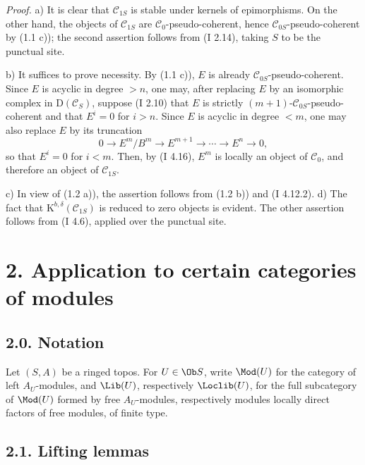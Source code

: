 \emph{Proof.} a) It is clear that $\mathcal C_{1S}$ is stable under kernels of epimorphisms. On the other hand, the objects of $\mathcal C_{1S}$ are $\mathcal C_0$-pseudo-coherent, hence $\mathcal C_{0S}$-pseudo-coherent by (1.1 c)); the second assertion follows from (I 2.14), taking $S$ to be the punctual site.

b) It suffices to prove necessity. By (1.1 c)), $E$ is already $\mathcal C_{0S}$-pseudo-coherent. Since $E$ is acyclic in degree $>n$, one may, after replacing $E$ by an isomorphic complex in $\mathrm D(\mathcal C_S)$, suppose (I 2.10) that $E$ is strictly $(m+1)$-$\mathcal C_{0S}$-pseudo-coherent and that $E^i=0$ for $i>n$. Since $E$ is acyclic in degree $<m$, one may also replace $E$ by its truncation
\[
0\longrightarrow E^m/B^m\longrightarrow E^{m+1}\longrightarrow\cdots\longrightarrow E^n\longrightarrow0,
\]
so that $E^i=0$ for $i<m$. Then, by (I 4.16), $E^m$ is locally an object of $\mathcal C_0$, and therefore an object of $\mathcal C_{1S}$.

c) In view of (1.2 a)), the assertion follows from (1.2 b)) and (I 4.12.2). d) The fact that $\mathrm K^{b,\delta}(\mathcal C_{1S})$ is reduced to zero objects is evident. The other assertion follows from (I 4.6), applied over the punctual site.

\section*{2. Application to certain categories of modules}

\subsection*{2.0. Notation}
Let $(S,A)$ be a ringed topos. For $U\in\Ob S$, write $\Mod(U)$ for the category of left $A_U$-modules, and $\Lib(U)$, respectively $\Loclib(U)$, for the full subcategory of $\Mod(U)$ formed by free $A_U$-modules, respectively modules locally direct factors of free modules, of finite type.

\subsection*{2.1. Lifting lemmas}

